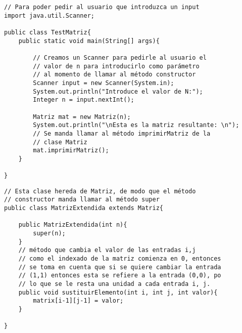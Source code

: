 \documentclass[11pt, oneside]{article}
\begin{document}
\begin{verbatim}
// Para poder pedir al usuario que introduzca un input
import java.util.Scanner; 

public class TestMatriz{
    public static void main(String[] args){

        // Creamos un Scanner para pedirle al usuario el
        // valor de n para introducirlo como parámetro
        // al momento de llamar al método constructor
        Scanner input = new Scanner(System.in);
        System.out.println("Introduce el valor de N:");
        Integer n = input.nextInt();

        Matriz mat = new Matriz(n);
        System.out.println("\nEsta es la matriz resultante: \n");
        // Se manda llamar al método imprimirMatriz de la
        // clase Matriz
        mat.imprimirMatriz();
    }

}
\end{verbatim}

\begin{verbatim}
// Esta clase hereda de Matriz, de modo que el método
// constructor manda llamar al método super
public class MatrizExtendida extends Matriz{

    public MatrizExtendida(int n){
        super(n);
    }
    // método que cambia el valor de las entradas i,j
    // como el indexado de la matriz comienza en 0, entonces
    // se toma en cuenta que si se quiere cambiar la entrada
    // (1,1) entonces esta se refiere a la entrada (0,0), po
    // lo que se le resta una unidad a cada entrada i, j.
    public void sustituirElemento(int i, int j, int valor){
        matrix[i-1][j-1] = valor;
    }

}
\end{verbatim}
\end{document}
